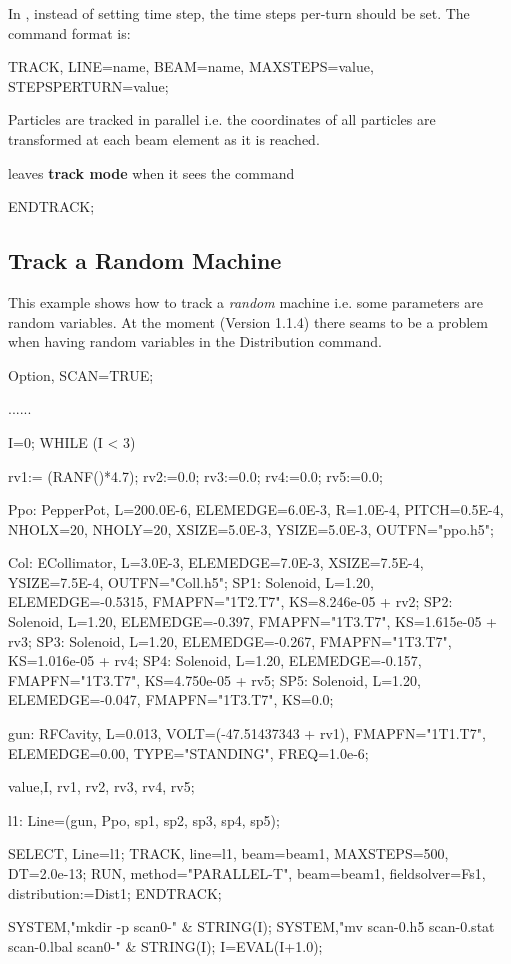 
In \opalcycl, instead of setting time step, the time steps per-turn should be set.
The command format is:
\begin{example}
TRACK, LINE=name, BEAM=name, MAXSTEPS=value,  STEPSPERTURN=value;
\end{example}

Particles are tracked in parallel i.e. the coordinates of all particles
are transformed at each beam element as it is reached.

\opal leaves \textbf{track mode} when it sees the command
\begin{example}
  ENDTRACK;
\end{example}




\subsection{Track a Random Machine} \label{sec:randmach}
This example shows how to track a {\em random} machine i.e. some
parameters are random variables. At the moment (Version 1.1.4) there seams to be a problem when
having random variables in the Distribution command.
\begin{example}
Option, SCAN=TRUE;

......

I=0;
WHILE (I < 3) {

   rv1:= (RANF()*4.7);
   rv2:=0.0;
   rv3:=0.0;
   rv4:=0.0;
   rv5:=0.0;

   Ppo: PepperPot, L=200.0E-6, ELEMEDGE=6.0E-3,
        R=1.0E-4, PITCH=0.5E-4, NHOLX=20, NHOLY=20,
        XSIZE=5.0E-3, YSIZE=5.0E-3, OUTFN="ppo.h5";

   Col: ECollimator, L=3.0E-3, ELEMEDGE=7.0E-3,
        XSIZE=7.5E-4, YSIZE=7.5E-4, OUTFN="Coll.h5";
   SP1: Solenoid, L=1.20, ELEMEDGE=-0.5315,
        FMAPFN="1T2.T7", KS=8.246e-05 + rv2;
   SP2: Solenoid, L=1.20, ELEMEDGE=-0.397,
        FMAPFN="1T3.T7", KS=1.615e-05 + rv3;
   SP3: Solenoid, L=1.20, ELEMEDGE=-0.267,
        FMAPFN="1T3.T7", KS=1.016e-05 + rv4;
   SP4: Solenoid, L=1.20, ELEMEDGE=-0.157,
        FMAPFN="1T3.T7", KS=4.750e-05 + rv5;
   SP5: Solenoid, L=1.20, ELEMEDGE=-0.047,
        FMAPFN="1T3.T7", KS=0.0;

   gun: RFCavity, L=0.013, VOLT=(-47.51437343 + rv1),
        FMAPFN="1T1.T7", ELEMEDGE=0.00,
        TYPE="STANDING", FREQ=1.0e-6;

   value,{I, rv1, rv2, rv3, rv4, rv5};

   l1: Line=(gun, Ppo, sp1, sp2, sp3, sp4, sp5);

   SELECT, Line=l1;
   TRACK, line=l1, beam=beam1, MAXSTEPS=500, DT=2.0e-13;
    RUN, method="PARALLEL-T", beam=beam1,
    fieldsolver=Fs1, distribution:=Dist1;
   ENDTRACK;

   SYSTEM,"mkdir -p scan0-" & STRING(I);
   SYSTEM,"mv scan-0.h5 scan-0.stat scan-0.lbal scan0-"
          & STRING(I);
   I=EVAL(I+1.0);
}
\end{example}



